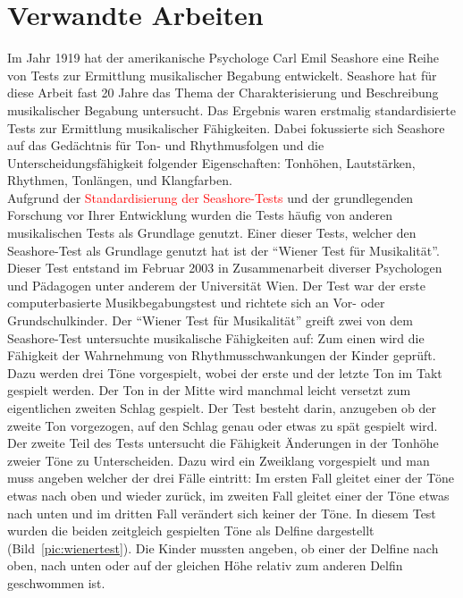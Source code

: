 \documentclass{acm_proc_article-sp}
\begin{document}
\section{Verwandte Arbeiten}
Im Jahr 1919 hat der amerikanische Psychologe Carl Emil Seashore eine Reihe von Tests zur Ermittlung musikalischer Begabung entwickelt\cite{gordon:2000}. Seashore hat für diese Arbeit fast 20 Jahre das Thema der Charakterisierung und Beschreibung musikalischer Begabung untersucht. Das Ergebnis waren erstmalig standardisierte Tests zur Ermittlung musikalischer Fähigkeiten. Dabei fokussierte sich Seashore auf das Gedächtnis für Ton- und Rhythmusfolgen und die Unterscheidungsfähigkeit folgender Eigenschaften: Tonhöhen, Lautstärken, Rhythmen, Tonlängen, und Klangfarben.\\
Aufgrund der \textcolor{red}{Standardisierung der Seashore-Tests} und der grundlegenden Forschung vor Ihrer Entwicklung wurden die Tests häufig von anderen musikalischen Tests als Grundlage genutzt. 
Einer dieser Tests, welcher den Seashore-Test als Grundlage genutzt hat ist der "`Wiener Test für Musikalität"'\cite{laengle:2003}. Dieser Test entstand im Februar 2003 in Zusammenarbeit diverser Psychologen und Pädagogen unter anderem der Universität Wien. Der Test war der erste computerbasierte Musikbegabungstest und richtete sich an Vor- oder Grundschulkinder. Der "`Wiener Test für Musikalität"' greift zwei von dem Seashore-Test untersuchte musikalische Fähigkeiten auf: Zum einen wird die Fähigkeit der Wahrnehmung von Rhythmusschwankungen der Kinder geprüft. Dazu werden drei Töne vorgespielt, wobei der erste und der letzte Ton im Takt gespielt werden. Der Ton in der Mitte wird manchmal leicht versetzt zum eigentlichen zweiten Schlag gespielt. Der Test besteht darin, anzugeben ob der zweite Ton vorgezogen, auf den Schlag genau oder etwas zu spät gespielt wird.\\
Der zweite Teil des Tests untersucht die Fähigkeit Änderungen in der Tonhöhe zweier Töne zu Unterscheiden. Dazu wird ein Zweiklang vorgespielt und man muss angeben welcher der drei Fälle eintritt: Im ersten Fall gleitet einer der Töne etwas nach oben und wieder zurück, im zweiten Fall gleitet einer der Töne etwas nach unten und im dritten Fall verändert sich keiner der Töne. In diesem Test wurden die beiden zeitgleich gespielten Töne als Delfine dargestellt (Bild~\ref{pic:wienertest}). Die Kinder mussten angeben, ob einer der Delfine nach oben, nach unten oder auf der gleichen Höhe relativ zum anderen Delfin geschwommen ist. 
\end{document}
